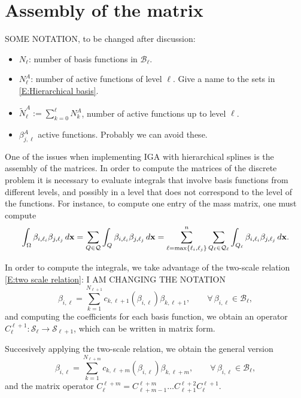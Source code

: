 \documentclass[a4paper]{siamltex1213}
\newcommand{\Rd}{\color{red}}
\newcommand\BB{\mathcal B}
\newcommand\QQ{\mathcal Q}
\newcommand\VV{\mathcal S}
\newcommand{\bx}{{\bf x}}
\begin{document}
\section{Assembly of the matrix}
{\Rd SOME NOTATION, to be changed after discussion:
\begin{itemize}
\item $N_\ell$: number of basis functions in $\BB_\ell$.
\item $N^A_\ell$: number of active functions of level $\ell$. Give a name to the sets in \eqref{E:Hierarchical basis}.
\item $\tilde N^A_\ell := \sum_{k=0}^\ell N^A_k$, number of active functions up to level $\ell$.
\item $\beta^A_{j,\ell}$ active functions. Probably we can avoid these.
\end{itemize}
}

One of the issues when implementing IGA with hierarchical splines is the assembly of the matrices. In order to compute the matrices of the discrete problem it is necessary to evaluate integrals that involve basis functions from different levels, and possibly in a level that does not correspond to the level of the functions. For instance, to compute one entry of the mass matrix, one must compute
\begin{equation*}
\int_\Omega \beta_{i,\ell_i} \beta_{j,\ell_j} \, d\bx = \sum_{Q \in \QQ} \int_Q \beta_{i,\ell_i} \beta_{j,\ell_j} \, d\bx = \sum_{\ell = \max\{\ell_i, \ell_j\}}^n \sum_{Q_\ell \in \QQ_\ell} \int_{Q_\ell} \beta_{i,\ell_i} \beta_{j,\ell_j} \, d\bx.
\end{equation*}

In order to compute the integrals, we take advantage of the two-scale relation \eqref{E:two scale relation}: {\Rd I AM CHANGING THE NOTATION}
\begin{equation*}
 \beta_{i,\ell} = \sum_{k=1}^{N_{\ell+1}}
c_{k,\ell+1}(\beta_{i,\ell})\beta_{k,\ell+1}, 
\qquad \forall\,\beta_{i,\ell} \in\BB_\ell,
\end{equation*}
and computing the coefficients for each basis function, we obtain an operator $C_\ell^{\ell+1}: \VV_\ell \longrightarrow \VV_{\ell+1}$, which can be written in matrix form.

Succesively applying the two-scale relation, we obtain the general version
\begin{equation*}
 \beta_{i,\ell} = \sum_{k=1}^{N_{\ell+m}}
c_{k,\ell+m}(\beta_{i,\ell})\beta_{k,\ell+m}, 
\qquad \forall\,\beta_{i,\ell} \in\BB_\ell,
\end{equation*}
and the matrix operator $C_\ell^{\ell+m} = C_{\ell+m-1}^{\ell+m} \ldots C_{\ell+1}^{\ell+2} C_\ell^{\ell+1}$.
\end{document}

